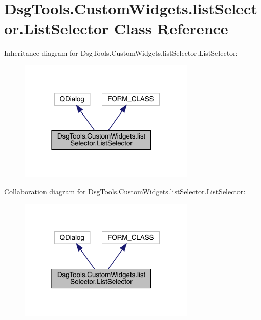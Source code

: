 \hypertarget{class_dsg_tools_1_1_custom_widgets_1_1list_selector_1_1_list_selector}{}\section{Dsg\+Tools.\+Custom\+Widgets.\+list\+Selector.\+List\+Selector Class Reference}
\label{class_dsg_tools_1_1_custom_widgets_1_1list_selector_1_1_list_selector}


Inheritance diagram for Dsg\+Tools.\+Custom\+Widgets.\+list\+Selector.\+List\+Selector\+:
\nopagebreak
\begin{figure}[H]
\begin{center}
\leavevmode
\includegraphics[width=238pt]{class_dsg_tools_1_1_custom_widgets_1_1list_selector_1_1_list_selector__inherit__graph}
\end{center}
\end{figure}


Collaboration diagram for Dsg\+Tools.\+Custom\+Widgets.\+list\+Selector.\+List\+Selector\+:
\nopagebreak
\begin{figure}[H]
\begin{center}
\leavevmode
\includegraphics[width=238pt]{class_dsg_tools_1_1_custom_widgets_1_1list_selector_1_1_list_selector__coll__graph}
\end{center}
\end{figure}
